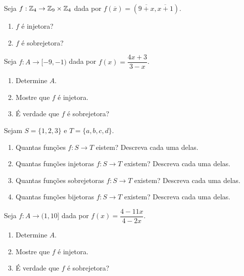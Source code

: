\documentclass[12pt]{exam}
\begin{document}
    \vspace{.3cm}

    \questao{} Seja $f: \mathbb{Z}_4 \to \mathbb{Z}_9 \times \mathbb{Z}_4$ dada por $f(\overline{x}) = (\overline{9 + x},\overline{x+1})$.
    \begin{enumerate}[label={\alph*})]
        \item $f$ {\'e} injetora?

        \item $f$ {\'e} sobrejetora?
    \end{enumerate}

    \vspace{.3cm}

    \questao{} Seja $f : A \to [-9,-1)$ dada por $f(x) = \dfrac{4x + 3}{3 - x}$.
    \begin{enumerate}[label={\alph*})]
        \item Determine $A$.

        \item Mostre que $f$ \'e injetora.

        \item \'E verdade que $f$ \'e sobrejetora?
    \end{enumerate}

    \vspace{.3cm}

    \questao{} Sejam $S = \{1, 2, 3\}$ e $T = \{a, b, c, d\}$.
    \begin{enumerate}[label={\alph*})]
        \item Quantas funções $f : S \to T$ eistem? Descreva cada uma delas.

        \item Quantas funções injetoras $f : S \to T$ existem? Descreva cada uma delas.

        \item Quantas funções sobrejetoras $f : S \to T$ existem? Descreva cada uma delas.

        \item Quantas funções bijetoras $f : S \to T$ existem? Descreva cada uma delas.
    \end{enumerate}

    \vspace{.3cm}

    \questao{} Seja $f : A \to (1,10]$ dada por $f(x) = \dfrac{4 - 11x}{4 - 2x}$.
    \begin{enumerate}[label={\alph*})]
        \item Determine $A$.

        \item Mostre que $f$ \'e injetora.

        \item \'E verdade que $f$ \'e sobrejetora?
    \end{enumerate}
\end{document}
